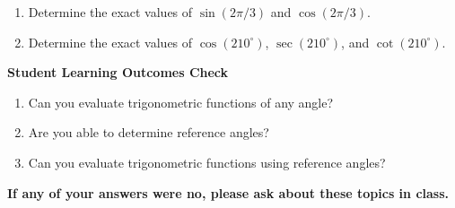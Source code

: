 \begin{enumerate}
\item Determine the exact values of $\sin(2\pi/3)$ and $\cos(2\pi/3)$. \\[1.5in] %


\item Determine the exact values of $\cos(210^\circ)$, $\sec(210^\circ)$, and $\cot(210^\circ)$. \\[1.5in]
\vfill
%
%
%
%


\end{enumerate}

\noindent \textbf{Student Learning Outcomes Check}

\begin{enumerate}
\item Can you evaluate trigonometric functions of any angle?
\item Are you able to determine reference angles?
\item Can you evaluate trigonometric functions using reference angles?
\end{enumerate}

\noindent \textbf{If any of your answers were no, please ask about these topics in class.}

